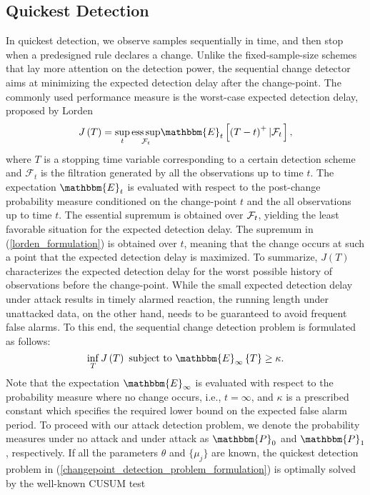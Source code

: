 \documentclass[11pt, draftclsnofoot, onecolumn]{IEEEtran}
\DeclareMathOperator{\esssup}{ess\,sup}
\newcommand{\bbE}{\mathbbm{E}}
\newcommand{\bbP}{\mathbbm{P}}
\newcommand{\cF}{\mathcal{F}}
\begin{document}
\subsection{Quickest Detection}

In quickest detection, we observe samples sequentially in time, and then stop when a predesigned rule declares a change. Unlike the fixed-sample-size schemes that lay more attention on the detection power, the sequential change detector aims at minimizing the expected detection delay after the change-point. The commonly used performance measure is the worst-case expected detection delay, proposed by Lorden \cite{lorden1971procedures}
\begin{equation} \label{lorden_formulation}
J\left( T \right) = \mathop {\sup }\limits_t  {\esssup _{{{\cal F}_t}}}{\bbE_t}\left[ {{{\left( {T - t} \right)}^ + }\left| {{{\cal F}_t}} \right.} \right],
\end{equation}
where $T$ is a stopping time variable corresponding to a certain detection scheme and $\cF_t$ is the filtration generated by all the observations up to time $t$. 
The expectation ${\bbE_t}$ is evaluated with respect to the post-change probability measure conditioned on the change-point $t$ and the all  observations up to time $t$. The essential supremum is obtained over ${{\cal F}_t}$, yielding the least favorable situation for the expected detection delay. The supremum in (\ref{lorden_formulation}) is obtained over $t$, meaning that the change occurs at such a point that the expected detection delay is maximized. To summarize, $J(T)$ characterizes the expected detection delay for the worst possible history of observations before the change-point. While the small expected detection delay under attack results in timely alarmed reaction, the running length under unattacked data, on the other hand, needs to be guaranteed to avoid frequent false alarms. To this end, the sequential change detection problem is formulated as follows:
\begin{equation} \label{changepoint_detection_problem_formulation}
\mathop {\inf }  \limits_T   J\left( T \right)  {\text{  subject to  }}   {\bbE_\infty }\left\{ T \right\} \ge \kappa.
\end{equation}
Note that  the expectation ${\bbE_{\infty}}$ is evaluated with respect to the probability measure where no change occurs, i.e., $t=\infty$, and $\kappa$ is a prescribed constant which specifies the required lower bound on the expected false alarm period. To proceed with our attack
detection problem, we denote the probability measures under no attack and under attack as $\bbP_0$ and $\bbP_1$, respectively. If all the parameters $\theta$ and $\{\mu_j\}$ are known, the quickest detection problem in (\ref{changepoint_detection_problem_formulation}) is optimally solved by the well-known CUSUM test \cite{moustakides1986optimal}
\end{document}
